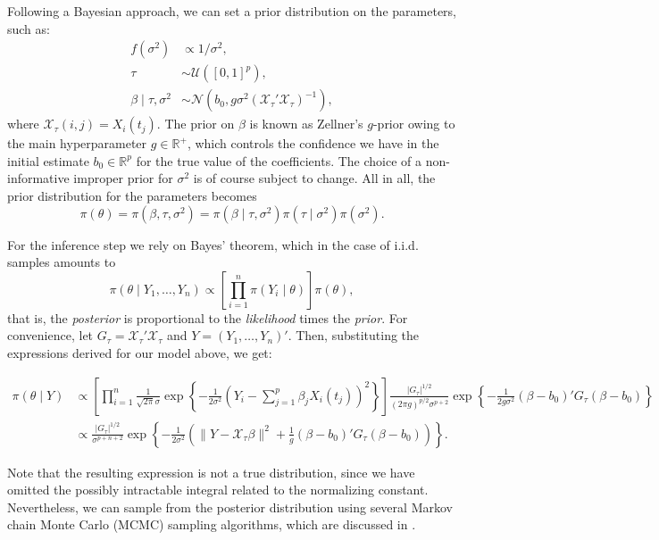\documentclass[
  a4paper,
	fontsize=11pt, %
	twoside=false, %
  secnumdepth=2,
	numbers=noenddot, %
]{kaohandt}
\newcommand{\R} {\ensuremath{\mathds{R}}}
\begin{document}
Following a Bayesian approach, we can set a prior distribution on the parameters, such as:
\begin{align*}
  f(\sigma^2)              & \propto 1/\sigma^2,                                                     \\
  \tau                     & \sim \mathscr U([0, 1]^p),                                              \\
  \beta\mid \tau, \sigma^2 & \sim \mathcal N(b_0, g\sigma^2(\mathcal X_\tau' \mathcal X_\tau)^{-1}),
\end{align*}
where
\(\mathcal X_\tau(i, j)=X_i(t_j)\). The prior on \(\beta\) is known as Zellner's \(g\)-prior owing to the main hyperparameter \(g\in \R^+\), which controls the confidence we have in the initial estimate \(b_0 \in \R^p\) for the true value of the coefficients. The choice of a non-informative improper prior for \(\sigma^2\) is of course subject to change. All in all, the prior distribution for the parameters becomes
\begin{equation}
  \label{eq:prior}
  \pi(\theta) = \pi(\beta, \tau, \sigma^2) = \pi(\beta \mid \tau, \sigma^2)\pi(\tau \mid \sigma^2)\pi(\sigma^2).
\end{equation}

For the inference step we rely on Bayes' theorem, which in the case of i.i.d. samples amounts to
\[
  \pi(\theta \mid Y_1, \dots, Y_n) \propto \left[ \prod_{i=1}^n \pi(Y_i\mid \theta) \right]\pi(\theta),
\]
that is, the \textit{posterior} is proportional to the \textit{likelihood} times the \textit{prior}. For convenience, let \(G_\tau=\mathcal X_\tau' \mathcal X_\tau\) and \(Y = (Y_1,\dots, Y_n)'\). Then, substituting the expressions derived for our model above, we get:
\begin{widepar}
  \begin{align*}
    \pi(\theta \mid Y) & \propto \left[ \prod_{i=1}^n  \frac{1}{\sqrt{2\pi}\sigma} \exp\left\{ -\frac{1}{2\sigma^2} \left(Y_i - \sum_{j=1}^{p}\beta_j X_i(t_j)\right)^2 \right\}\right]\frac{|G_\tau|^{1/2}}{(2\pi g)^{p/2}\sigma^{p+2}} \exp\left\{ -\frac{1}{2g\sigma^2} (\beta - b_0)'G_\tau(\beta - b_0)\right\} \\
                       & \propto \frac{|G_\tau|^{1/2}}{\sigma^{p+n+2}} \exp\left\{ -\frac{1}{2\sigma^2} \left(\|Y- \mathcal X_\tau\beta\|^2 + \frac{1}{g}(\beta - b_0)'G_\tau(\beta - b_0) \right) \right\}.
  \end{align*}
\end{widepar}
Note that the resulting expression is not a true distribution, since we have omitted the possibly intractable integral related to the normalizing constant. Nevertheless, we can sample from the posterior distribution using several Markov chain Monte Carlo (MCMC) sampling algorithms, which are discussed in .
\end{document}
